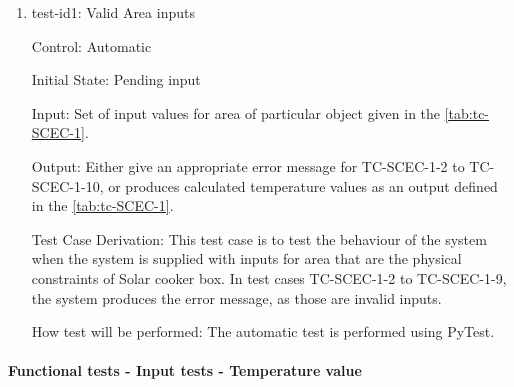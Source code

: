 \documentclass[12pt, titlepage]{article}
\begin{document}
\begin{enumerate}

\item{test-id1: Valid Area inputs  \\}

Control: Automatic
					
Initial State: Pending input 
					
Input: Set of input values for area of particular object given in the \autoref{tab:tc-SCEC-1}. 
					
Output: Either give an appropriate error message for TC-SCEC-1-2 to TC-SCEC-1-10, or produces calculated temperature values as an output defined in the \autoref{tab:tc-SCEC-1}. 

Test Case Derivation: This test case is to test the behaviour of the system when the system is supplied with inputs for area that are the physical constraints of Solar cooker box. In test cases TC-SCEC-1-2 to TC-SCEC-1-9, the system produces the error message, as those are invalid inputs.     
					
How test will be performed: The automatic test is performed using PyTest.  

\end{enumerate}

\paragraph{Functional tests - Input tests - Temperature value}

\begin{center}
\begin{table}[h!]
\caption{TC-SCEC-2 - Temperature input constraints tests}
\label{tab:tc-SCEC-2}
\end{table}
\end{center}
\end{document}
